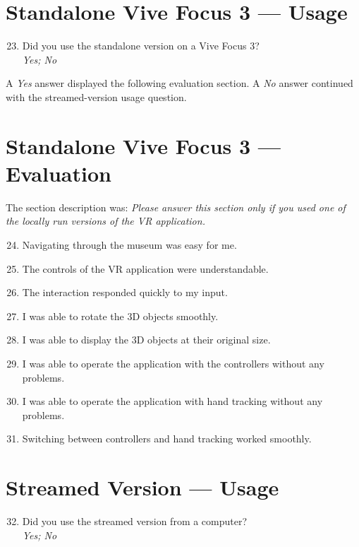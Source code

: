 \section{Standalone Vive Focus 3 --- Usage}

\begin{enumerate}
  \setcounter{enumi}{22}
  \item Did you use the standalone version on a Vive Focus 3?\\
  \emph{Yes; No}
\end{enumerate}

A \emph{Yes} answer displayed the following evaluation section. A \emph{No} answer continued with the streamed-version usage question.

\section{Standalone Vive Focus 3 --- Evaluation}

The section description was: \emph{Please answer this section only if you used one of the locally run versions of the VR application.}

\begin{enumerate}
  \setcounter{enumi}{23}
  \item Navigating through the museum was easy for me.
  \item The controls of the VR application were understandable.
  \item The interaction responded quickly to my input.
  \item I was able to rotate the 3D objects smoothly.
  \item I was able to display the 3D objects at their original size.
  \item I was able to operate the application with the controllers without any problems.
  \item I was able to operate the application with hand tracking without any problems.
  \item Switching between controllers and hand tracking worked smoothly.
\end{enumerate}

\section{Streamed Version --- Usage}

\begin{enumerate}
  \setcounter{enumi}{31}
  \item Did you use the streamed version from a computer?\\
  \emph{Yes; No}
\end{enumerate}

